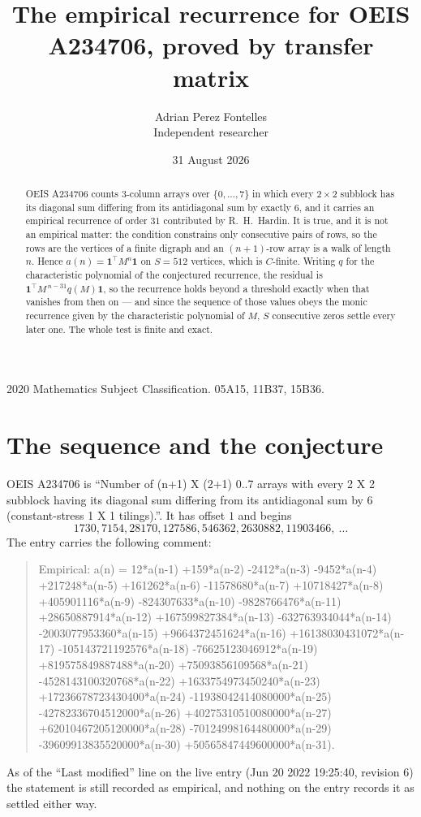 \documentclass[11pt,a4paper]{article}
\title{The empirical recurrence for OEIS A234706, proved by transfer matrix}
\author{Adrian Perez Fontelles\\ \small Independent researcher}
\date{31 August 2026}
\theoremstyle{plain}
\theoremstyle{definition}
\begin{document}
\maketitle

\begin{abstract}
OEIS A234706 counts $3$-column arrays over $\{0,\dots,7\}$ in which every
$2\times2$ subblock has its diagonal sum differing from its antidiagonal sum by
exactly $6$, and it
carries an empirical recurrence of order $31$ contributed by R.~H.~Hardin. It is true,
and it is not an empirical matter: the condition constrains only consecutive pairs of rows,
so the rows are the vertices of a finite digraph and an $(n+1)$-row array is a walk of
length $n$. Hence $a(n)=\mathbf{1}^{\!\top}M^{n}\mathbf{1}$ on $S=512$ vertices, which
is $C$-finite. Writing $q$ for the characteristic polynomial of the conjectured recurrence,
the residual is $\mathbf{1}^{\!\top}M^{\,n-31}q(M)\mathbf{1}$, so the recurrence
holds beyond a threshold exactly when that vanishes from then on --- and since the sequence
of those values obeys the monic recurrence given by the characteristic polynomial of $M$,
$S$ consecutive zeros settle every later one. The whole test is finite and exact.
\end{abstract}

\noindent\small 2020 Mathematics Subject Classification. 05A15, 11B37, 15B36.\normalsize

\section{The sequence and the conjecture}

OEIS A234706 is ``Number of (n+1) X (2+1) 0..7 arrays with every 2 X 2 subblock having its diagonal sum differing from its antidiagonal sum by 6 (constant-stress 1 X 1 tilings).''. It has offset
$1$ and begins
\[
1730, 7154, 28170, 127586, 546362, 2630882, 11903466,\ \dots
\]
The entry carries the following comment:
\begin{quote}\small
Empirical: a(n) = 12*a(n-1) +159*a(n-2) -2412*a(n-3) -9452*a(n-4) +217248*a(n-5) +161262*a(n-6) -11578680*a(n-7) +10718427*a(n-8) +405901116*a(n-9) -824307633*a(n-10) -9828766476*a(n-11) +28650887914*a(n-12) +167599827384*a(n-13) -632763934044*a(n-14) -2003077953360*a(n-15) +9664372451624*a(n-16) +16138030431072*a(n-17) -105143721192576*a(n-18) -76625123046912*a(n-19) +819575849887488*a(n-20) +75093856109568*a(n-21) -4528143100320768*a(n-22) +1633754973450240*a(n-23) +17236678723430400*a(n-24) -11938042414080000*a(n-25) -42782336704512000*a(n-26) +40275310510080000*a(n-27) +62010467205120000*a(n-28) -70124998164480000*a(n-29) -39609913835520000*a(n-30) +50565847449600000*a(n-31).
\end{quote}
As of the ``Last modified'' line on the live entry (Jun 20 2022 19:25:40, revision 6) the statement is
still recorded as empirical, and nothing on the entry records it as settled either way.
\end{document}
